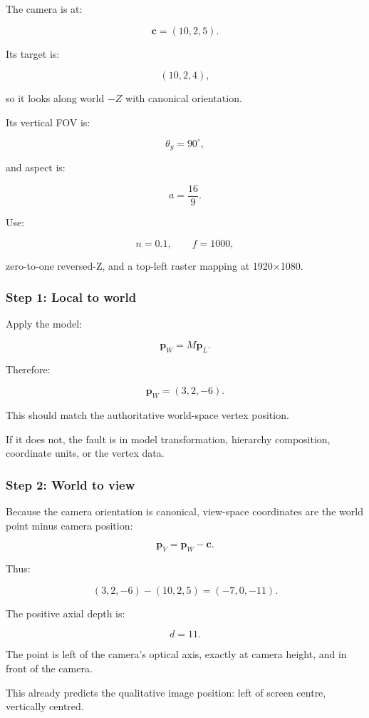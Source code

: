 The camera is at:

\[ \boxed{ \mathbf c=(10,2,5). } \]

Its target is:

\[ (10,2,4), \]

so it looks along world \(-Z\) with canonical orientation.

Its vertical FOV is:

\[ \theta_y=90^\circ, \]

and aspect is:

\[ a=\frac{16}{9}. \]

Use:

\[ n=0.1,\qquad f=1000, \]

zero-to-one reversed-Z, and a top-left raster mapping at 1920×1080.

\subsubsection{Step 1: Local to world}\label{step-1-local-to-world}

Apply the model:

\[ \mathbf p_W=M\mathbf p_L. \]

Therefore:

\[ \boxed{ \mathbf p_W=(3,2,-6). } \]

This should match the authoritative world-space vertex position.

If it does not, the fault is in model transformation, hierarchy composition, coordinate units, or the vertex data.

\subsubsection{Step 2: World to view}\label{step-2-world-to-view}

Because the camera orientation is canonical, view-space coordinates are the world point minus camera position:

\[ \mathbf p_V=\mathbf p_W-\mathbf c. \]

Thus:

\[ (3,2,-6)-(10,2,5) = \boxed{(-7,0,-11)}. \]

The positive axial depth is:

\[ \boxed{d=11}. \]

The point is left of the camera's optical axis, exactly at camera height, and in front of the camera.

This already predicts the qualitative image position: left of screen centre, vertically centred.

